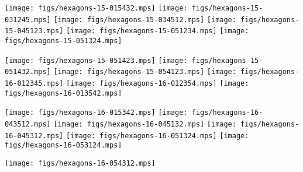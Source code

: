 \noindent
\texttt{[image: figs/hexagons-15-015432.mps]}
\texttt{[image: figs/hexagons-15-031245.mps]}
\texttt{[image: figs/hexagons-15-034512.mps]}
\texttt{[image: figs/hexagons-15-045123.mps]}
\texttt{[image: figs/hexagons-15-051234.mps]}
\texttt{[image: figs/hexagons-15-051324.mps]}

\noindent
\texttt{[image: figs/hexagons-15-051423.mps]}
\texttt{[image: figs/hexagons-15-051432.mps]}
\texttt{[image: figs/hexagons-15-054123.mps]}
\texttt{[image: figs/hexagons-16-012345.mps]}
\texttt{[image: figs/hexagons-16-012354.mps]}
\texttt{[image: figs/hexagons-16-013542.mps]}

\noindent
\texttt{[image: figs/hexagons-16-015342.mps]}
\texttt{[image: figs/hexagons-16-043512.mps]}
\texttt{[image: figs/hexagons-16-045132.mps]}
\texttt{[image: figs/hexagons-16-045312.mps]}
\texttt{[image: figs/hexagons-16-051324.mps]}
\texttt{[image: figs/hexagons-16-053124.mps]}

\noindent
\texttt{[image: figs/hexagons-16-054312.mps]}
